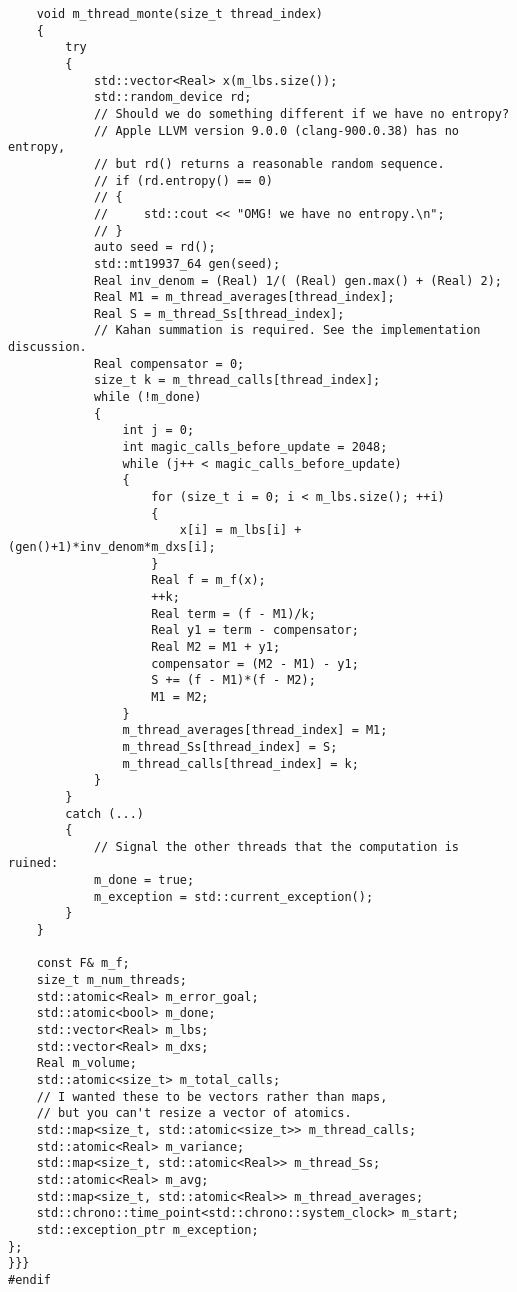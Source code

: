 \documentclass[landscape]{article}
\numberwithin{equation}{section}
\begin{document}
\begin{verbatim}
    void m_thread_monte(size_t thread_index)
    {
        try
        {
            std::vector<Real> x(m_lbs.size());
            std::random_device rd;
            // Should we do something different if we have no entropy?
            // Apple LLVM version 9.0.0 (clang-900.0.38) has no entropy,
            // but rd() returns a reasonable random sequence.
            // if (rd.entropy() == 0)
            // {
            //     std::cout << "OMG! we have no entropy.\n";
            // }
            auto seed = rd();
            std::mt19937_64 gen(seed);
            Real inv_denom = (Real) 1/( (Real) gen.max() + (Real) 2);
            Real M1 = m_thread_averages[thread_index];
            Real S = m_thread_Ss[thread_index];
            // Kahan summation is required. See the implementation discussion.
            Real compensator = 0;
            size_t k = m_thread_calls[thread_index];
            while (!m_done)
            {
                int j = 0;
                int magic_calls_before_update = 2048;
                while (j++ < magic_calls_before_update)
                {
                    for (size_t i = 0; i < m_lbs.size(); ++i)
                    {
                        x[i] = m_lbs[i] + (gen()+1)*inv_denom*m_dxs[i];
                    }
                    Real f = m_f(x);
                    ++k;
                    Real term = (f - M1)/k;
                    Real y1 = term - compensator;
                    Real M2 = M1 + y1;
                    compensator = (M2 - M1) - y1;
                    S += (f - M1)*(f - M2);
                    M1 = M2;
                }
                m_thread_averages[thread_index] = M1;
                m_thread_Ss[thread_index] = S;
                m_thread_calls[thread_index] = k;
            }
        }
        catch (...)
        {
            // Signal the other threads that the computation is ruined:
            m_done = true;
            m_exception = std::current_exception();
        }
    }

    const F& m_f;
    size_t m_num_threads;
    std::atomic<Real> m_error_goal;
    std::atomic<bool> m_done;
    std::vector<Real> m_lbs;
    std::vector<Real> m_dxs;
    Real m_volume;
    std::atomic<size_t> m_total_calls;
    // I wanted these to be vectors rather than maps,
    // but you can't resize a vector of atomics.
    std::map<size_t, std::atomic<size_t>> m_thread_calls;
    std::atomic<Real> m_variance;
    std::map<size_t, std::atomic<Real>> m_thread_Ss;
    std::atomic<Real> m_avg;
    std::map<size_t, std::atomic<Real>> m_thread_averages;
    std::chrono::time_point<std::chrono::system_clock> m_start;
    std::exception_ptr m_exception;
};
}}}
#endif
\end{verbatim}
\end{document}

